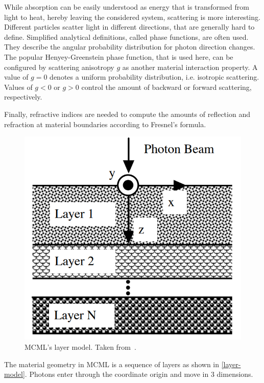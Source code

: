 \documentclass[]{article}
\begin{document}
While absorption can be easily understood as energy that is transformed from light to heat, hereby leaving the considered system, scattering is more interesting. Different particles scatter light in different directions, that are generally hard to define. Simplified analytical definitions, called phase functions, are often used. They describe the angular probability distribution for photon direction changes. The popular Henyey-Greenstein phase function, that is used here, can be configured by scattering anisotropy $g$ as another material interaction property. A value of $g=0$ denotes a uniform probability distribution, i.e. isotropic scattering. Values of $g<0$ or $g>0$ control the amount of backward or forward scattering, respectively.

Finally, refractive indices are needed to compute the amounts of reflection and refraction at material boundaries according to Fresnel's formula.

\begin{figure}[ht!]
	\includegraphics[width=\linewidth]{img/layer-model.png}
	\caption{MCML's layer model. Taken from~\cite{wang1992monte}.}
	\label{layer-model}
\end{figure}

The material geometry in MCML is a sequence of layers as shown in \autoref{layer-model}. Photons enter through the coordinate origin and move in 3 dimensions.
\end{document}
